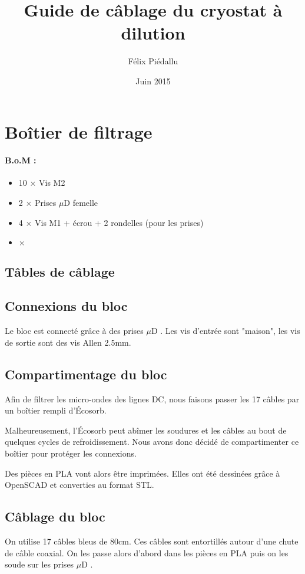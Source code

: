 \documentclass[a4paper,11pt]{article}
\title{Guide de câblage du cryostat à dilution}
\author{Félix Piédallu}
\date{Juin 2015}
\newcommand{\fois}{$\times$ }
\newcommand{\uD}{$\mu$D }
\newenvironment{BOM}
  {%
    \paragraph{B.o.M : } \begin{itemize}%
  }{%
    \end{itemize}\medskip%
  }
\begin{document}
\maketitle
\tableofcontents

\section{Boîtier de filtrage}

\begin{BOM}
    \item 10 \fois Vis M2
    \item 2 \fois Prises \uD femelle
    \item 4 \fois Vis M1 + écrou + 2 rondelles (pour les prises)
    \item \fois 
\end{BOM}

\subsection{Tâbles de câblage}

\subsection{Connexions du bloc}
Le bloc est connecté grâce à des prises \uD. Les vis d'entrée sont "maison", les vis de sortie sont des vis Allen 2.5mm.

\subsection{Compartimentage du bloc}
Afin de filtrer les micro-ondes des lignes DC, nous faisons passer les 17 câbles par un boîtier rempli d'Écosorb.

Malheureusement, l'Écosorb peut abîmer les soudures et les câbles au bout de quelques cycles de refroidissement. Nous avons donc décidé de compartimenter ce boîtier pour protéger les connexions.

Des pièces en PLA vont alors être imprimées. Elles ont été dessinées grâce à OpenSCAD et converties au format STL.

\subsection{Câblage du bloc}
On utilise 17 câbles bleus de 80cm. Ces câbles sont entortillés autour d'une chute de câble coaxial. On les passe alors d'abord dans les pièces en PLA puis on les soude sur les prises \uD.
\end{document}
